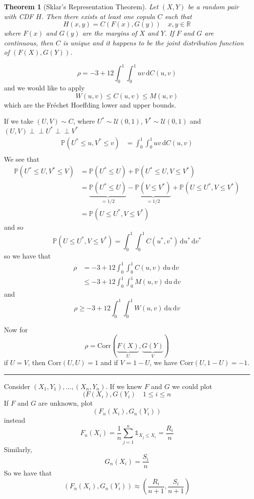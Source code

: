 \documentclass[a4paper,12pt]{amsart}
\newcommand{\sumjn}{\sum_{j=1}^n}
\newcommand{\du}{\,\mathrm{d}u}
\newcommand{\dv}{\,\mathrm{d}v}
\newcommand{\Corr}{\mbox{Corr}}
\newcommand{\p}[1]{\mathbb{P}\left(#1\right)}
\newcommand{\indep}{\perp \!\!\! \perp}
\newtheorem{theorem}{Theorem}
\begin{document}
\bigskip

\begin{theorem}[Sklar's Representation Theorem]
Let $(X,Y)$ be a random pair with CDF $H$. Then there exists at least one copula $C$ such that 
\[H(x,y) = C(F(x),G(y)) \quad x,y \in \mathbb{R}\]
where $F(x)$ and $G(y)$ are the margins of $X$ and $Y$. If $F$ and $G$ are continuous, then $C$ is unique and it happens to be the joint distribution function of $(F(X),G(Y))$.
\end{theorem}

\[\rho = -3 + 12 \int_0^1 \int_0^1 \! uv \, \mathrm{d}C(u,v)\]
and we would like to apply
\[W(u,v) \leq C(u,v) \leq M(u,v)\]
which are the Fr\'echet Hoeffding lower and upper bounds.

\bigskip

If we take $(U,V) \sim C$, where $U^* \sim \mathcal{U}(0,1)$, $V^* \sim \mathcal{U}(0,1)$ and $(U,V) \indep U^* \indep V^*$
\begin{align*}
\p{U^* \leq u, V^* \leq v} &= \int_0^1 \int_0^1 \! uv \, \mathrm{d}C(u,v)\\
\end{align*}
We see that 
\begin{align*}
\p{U^* \leq U, V^* \leq V} &= \p{U^* \leq U} + \p{U^* \leq U, V \leq V^*}\\
&=\underbrace{\p{U^* \leq U}}_{=1/2} - \underbrace{\p{V \leq V^*}}_{=1/2} + \p{U \leq U^*, V \leq V^*}\\
&= \p{U \leq U^*, V \leq V^*}
\end{align*}
and so
\[\p{U \leq U^*,V \leq V^*} = \int_0^1 \int_0^1 \! C(u^*,v^*) \du^* \dv^*\]
so we have that
\begin{align*}
\rho &= -3 + 12 \int_0^1 \int_0^1 \! C(u,v) \du \dv\\
&\leq -3 + 12 \int_0^1 \int_0^1 \! M(u,v) \du \dv
\end{align*}
and
\[\rho \geq -3 + 12 \int_0^1 \int_0^1 \! W(u,v) \du \dv\]

Now for 
\[\rho = \Corr(\underbrace{F(X)}_U,\underbrace{G(Y)}_V)\]
if $U = V$, then $\Corr(U,U) = 1$ and if $V = 1-U$, we have $\Corr(U,1-U) = -1$.

\bigskip
\hrule
\bigskip
Consider $(X_1,Y_1), \ldots ,(X_n,Y_n)$. If we knew $F$ and $G$ we could plot 
\[(F(X_i),G(Y_i) \quad 1 \leq i \leq n\]
If $F$ and $G$ are unknown, plot 
\[(F_n(X_i),G_n(Y_i))\] 
instead
\[F_n(X_i) = \frac{1}{n}\sumjn \mathds{1}_{X_j \leq X_i} = \frac{R_i}{n}\]
Similarly, 
\[G_n(X_i) = \frac{S_i}{n}\]
So we have that
\[(F_n(X_i),G_n(Y_i)) \approx \left(\frac{R_i}{n+1},\frac{S_i}{n+1}\right)\]
\end{document}
